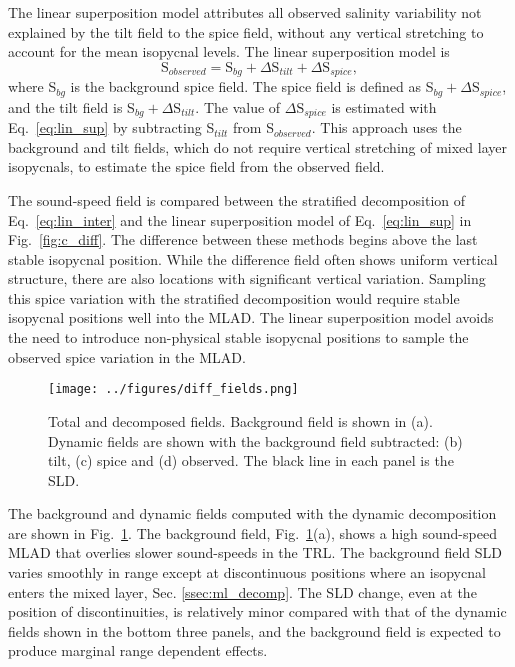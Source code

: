 \documentclass[preprint,NumberedRefs]{JASA}
\begin{document}
The linear superposition model attributes all observed salinity variability not explained by the tilt field to the spice field, without any vertical stretching to account for the mean isopycnal levels. The linear superposition model is
\begin{equation}
    \textrm{S}_{observed} = \textrm{S}_{bg} + \Delta \textrm{S}_{tilt} + \Delta \textrm{S}_{spice},
    \label{eq:lin_sup}
\end{equation}
where S$_{bg}$ is the background spice field. The spice field is defined as S$_{bg} + \Delta \textrm{S}_{spice}$, and the tilt field is S$_{bg} + \Delta \textrm{S}_{tilt}$. The value of $\Delta \textrm{S}_{spice}$ is estimated with Eq.~\eqref{eq:lin_sup} by subtracting S$_{tilt}$ from S$_{observed}$. This approach uses the background and tilt fields, which do not require vertical stretching of mixed layer isopycnals, to estimate the spice field from the observed field.

The sound-speed field is compared between the stratified decomposition of Eq.~\eqref{eq:lin_inter} and the linear superposition model of Eq.~\eqref{eq:lin_sup} in Fig.~\ref{fig:c_diff}. The difference between these methods begins above the last stable isopycnal position. While the difference field often shows uniform vertical structure, there are also locations with significant vertical variation. Sampling this spice variation with the stratified decomposition would require stable isopycnal positions well into the MLAD. The linear superposition model avoids the need to introduce non-physical stable isopycnal positions to sample the observed spice variation in the MLAD.

\begin{figure}
\texttt{[image: ../figures/diff\_fields.png]}
        \caption{\label{fig:c_fields}{Total and decomposed fields. Background field is shown in (a). Dynamic fields are shown with the background field subtracted: (b) tilt, (c) spice and (d) observed. The black line in each panel is the SLD.}}
\end{figure}

The background and dynamic fields computed with the dynamic decomposition are shown in Fig.~\ref{fig:c_fields}. The background field, Fig.~\ref{fig:c_fields}(a), shows a high sound-speed MLAD that overlies slower sound-speeds in the TRL. The background field SLD varies smoothly in range except at discontinuous positions where an isopycnal enters the mixed layer, Sec. \ref{ssec:ml_decomp}. The SLD change, even at the position of discontinuities, is relatively minor compared with that of the dynamic fields shown in the bottom three panels, and the background field is expected to produce marginal range dependent effects.
\end{document}
